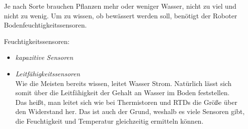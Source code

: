 Je nach Sorte brauchen Pflanzen mehr oder weniger Wasser, nicht zu viel und
nicht zu wenig. Um zu wissen, ob bewässert werden soll, benötigt der Roboter
Bodenfeuchtigkeitssensoren.

\begin{description}
	\item {Feuchtigkeitssensoren:}
	      \begin{itemize}
		      \item {\textit{kapazitive Sensoren}}\\
		            
		      \item {\textit{Leitfähigkeitssensoren}}\\
		            Wie die Meisten bereits wissen, leitet Wasser Strom. Natürlich lässt sich somit über die Leitfähigkeit der Gehalt an Wasser im Boden feststellen.\\
		            Das heißt, man leitet sich wie bei Thermistoren und RTDs die Größe über den Widerstand her. Das ist auch der Grund, weshalb es viele Sensoren gibt, die Feuchtigkeit und Temperatur gleichzeitig ermitteln können.
	      \end{itemize}
\end{description}